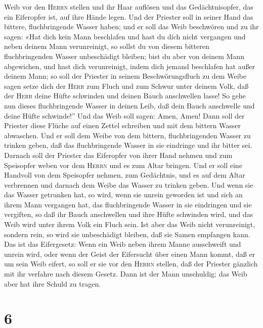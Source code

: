 Weib vor den \textsc{Herrn} stellen und ihr Haar auflösen und das
Gedächtnisopfer, das ein Eiferopfer ist, auf ihre Hände legen. Und der
Priester soll in seiner Hand das bittere, fluchbringende Wasser haben;
 und er soll das Weib beschwören und zu ihr sagen: «Hat
dich kein Mann beschlafen und hast du dich nicht vergangen und neben
deinem Mann verunreinigt, so sollst du von diesem bitteren
fluchbringenden Wasser unbeschädigt bleiben;  bist du
aber von deinem Mann abgewichen, und hast dich verunreinigt, indem dich
jemand beschlafen hat außer deinem Mann;  so soll der
Priester in seinem Beschwörungsfluch zu dem Weibe sagen setze dich der
\textsc{Herr} zum Fluch und zum Schwur unter deinem Volk, daß der
\textsc{Herr} deine Hüfte schwinden und deinen Bauch anschwellen lasse!
 So gehe nun dieses fluchbringende Wasser in deinen Leib,
daß dein Bauch anschwelle und deine Hüfte schwinde!'' Und das Weib soll
sagen: Amen, Amen!  Dann soll der Priester diese Flüche
auf einen Zettel schreiben und mit dem bittern Wasser abwaschen.
 Und er soll dem Weibe von dem bittern, fluchbringenden
Wasser zu trinken geben, daß das fluchbringende Wasser in sie eindringe
und ihr bitter sei.  Darnach soll der Priester das
Eiferopfer von ihrer Hand nehmen und zum Speisopfer weben vor dem
\textsc{Herrn} und es zum Altar bringen.  Und er soll
eine Handvoll von dem Speisopfer nehmen, zum Gedächtnis, und es auf dem
Altar verbrennen und darnach dem Weibe das Wasser zu trinken geben.
 Und wenn sie das Wasser getrunken hat, so wird, wenn sie
unrein geworden ist und sich an ihrem Mann vergangen hat, das
fluchbringende Wasser in sie eindringen und sie vergiften, so daß ihr
Bauch anschwellen und ihre Hüfte schwinden wird, und das Weib wird unter
ihrem Volk ein Fluch sein.  Ist aber das Weib nicht
verunreinigt, sondern rein, so wird sie unbeschädigt bleiben, daß sie
Samen empfangen kann.  Das ist das Eifergesetz: Wenn ein
Weib neben ihrem Manne ausschweift und unrein wird,  oder
wenn der Geist der Eifersucht über einen Mann kommt, daß er um sein Weib
eifert, so soll er sie vor den \textsc{Herrn} stellen, daß der Priester
gänzlich mit ihr verfahre nach diesem Gesetz.  Dann ist
der Mann unschuldig; das Weib aber hat ihre Schuld zu tragen.

\hypertarget{section-5}{%
\section{6}\label{section-5}}

